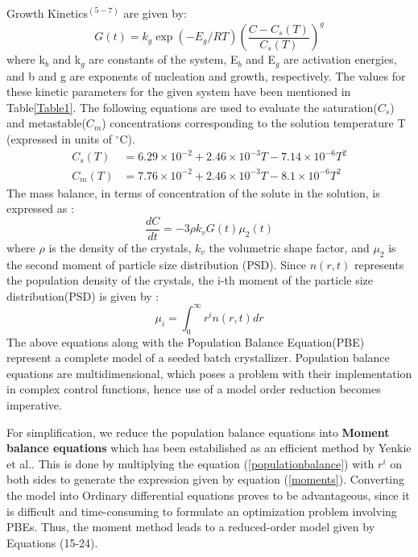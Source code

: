 \documentclass[3p,times]{elsarticle}
\begin{document}
Growth Kinetics$^{(5-7)}$ are given by:
\begin{equation}
G(t) = k_{g}\exp{\left(-E_{g}/RT \right)}\left(\frac{C - C_{s}(T)}{C_{s}(T)}\right)^{g}
\end{equation}
where k$_{b}$ and k$_{g}$ are constants of the system, E$_{b}$ and E$_{g}$ are activation energies, and b and g are exponents of nucleation and growth, respectively. The values for these kinetic parameters for the given system have been mentioned in Table\ref{Table1}. The following equations are used to evaluate the saturation($C_{s}$) and metastable($C_{m}$) concentrations corresponding to the solution temperature T (expressed in units of $^\circ$C)\cite{shi}. \\
\begin{align}
C_{s}(T) &= 6.29\times10^{-2} + 2.46\times10^{-3}T - 7.14\times10^{-6}T^{2} \label{sat}\\
C_{m}(T) &= 7.76\times10^{-2} + 2.46\times10^{-3}T - 8.1\times10^{-6}T^{2} \label{meta}
\end{align} 
The mass balance, in terms of concentration of the solute in the solution, is expressed as :
\begin{equation}
\frac{dC}{dt} = -3\rho{}k_{v}G(t)\mu_{2}(t)
\end{equation}
where $\rho{}$ is the density of the crystals, $k_{v}$ the volumetric shape factor, and $\mu_{2}$ is the second moment of particle size distribution (PSD).
Since $n(r,t)$ represents the population density of the crystals, the i-th moment of the particle size distribution(PSD) is given by :
\begin{equation} \label{moments}
\mu_{i} = \int_{0}^{\infty} r^{i}n(r,t) dr
\end{equation}
The above equations along with the Population Balance Equation(PBE) represent a complete model of a seeded batch crystallizer. 
Population balance equations are multidimensional, which poses a problem with their implementation in complex control functions, hence use of a model order reduction becomes imperative.\par
For simplification, we reduce the population balance equations into \textbf{Moment balance equations} which has been estabilished as an efficient method by Yenkie et al.\cite{yenkie}. This is done by multiplying the equation (\ref{populationbalance})  with $r^{i}$ on both sides to generate the expression given by equation (\ref{moments}). Converting the model into Ordinary differential equations proves to be advantageous, since it is difficult and time-consuming to formulate an optimization problem involving PBEs. Thus, the moment method leads to a reduced-order model given by Equations (15-24).\\ 
\end{document}
